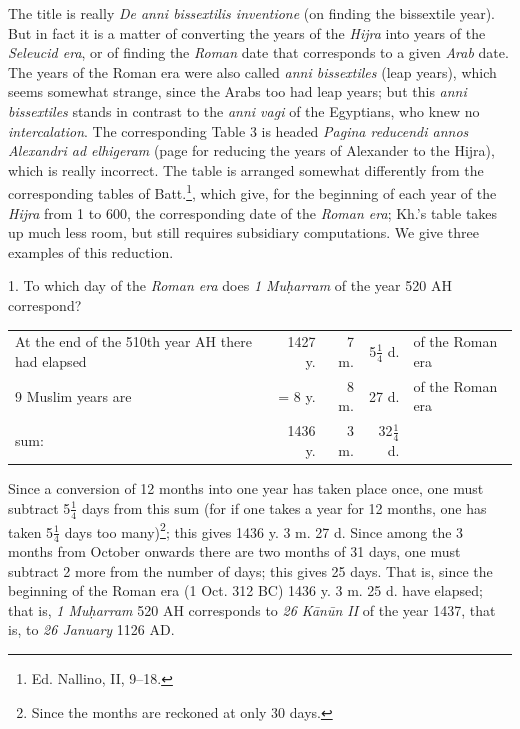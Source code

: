 \documentclass[11pt]{article}
\begin{document}
\par The title is really \emph{De anni bissextilis inventione} (on finding the bissextile year). But in fact it is a matter of converting the years of the \emph{Hijra} into years of the \emph{Seleucid era}, or of finding the \emph{Roman} date that corresponds to a given \emph{Arab} date. The years of the Roman era were also called \emph{anni bissextiles} (leap years), which seems somewhat strange, since the Arabs too had leap years; but this \emph{anni bissextiles} stands in contrast to the \emph{anni vagi} of the Egyptians, who knew no \emph{intercalation}. The corresponding Table 3 is headed \emph{Pagina reducendi annos Alexandri ad elhigeram} (page for reducing the years of Alexander to the Hijra), which is really incorrect. The table is arranged somewhat differently from the corresponding tables of Batt.\footnote{Ed. Nallino, II, 9–18.}, which give, for the beginning of each year of the \emph{Hijra} from 1 to 600, the corresponding date of the \emph{Roman era}; Kh.'s table takes up much less room, but still requires subsidiary computations. We give three examples of this reduction.\par
\par 1. To which day of the \emph{Roman era} does \emph{1 Muḥarram} of the year 520 AH correspond?\par
\begin{center}\small\begin{tabular}{lrrrl}
At the end of the 510th year AH there had elapsed & 1427 y. & 7 m. & 5$\tfrac{1}{4}$ d. & of the Roman era \\
9 Muslim years are & = 8 y. & 8 m. & 27 d. & of the Roman era \\
sum: & 1436 y. & 3 m. & 32$\tfrac{1}{4}$ d. &  \\
\end{tabular}\end{center}
\par Since a conversion of 12 months into one year has taken place once, one must subtract 5$\tfrac{1}{4}$ days from this sum (for if one takes a year for 12 months, one has taken 5$\tfrac{1}{4}$ days too many)\footnote{Since the months are reckoned at only 30 days.}; this gives 1436 y. 3 m. 27 d. Since among the 3 months from October onwards there are two months of 31 days, one must subtract 2 more from the number of days; this gives 25 days. That is, since the beginning of the Roman era (1 Oct. 312 BC) 1436 y. 3 m. 25 d. have elapsed; that is, \emph{1 Muḥarram} 520 AH corresponds to \emph{26 Kānūn II} of the year 1437, that is, to \emph{26 January} 1126 AD.\par
\end{document}
